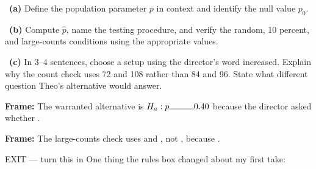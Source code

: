 \documentclass[11pt]{article}
\begin{document}
~\textbf{(a)} Define the population parameter $p$ in context and identify the null value $p_0$.\par
\workspace{0.7in}

~\textbf{(b)} Compute $\hat p$, name the testing procedure, and verify the random, 10 percent, and large-counts conditions using the appropriate values.\par
\workspace{1.4in}

~\textbf{(c)} In 3--4 sentences, choose a setup using the director's word increased. Explain why the count check uses 72 and 108 rather than 84 and 96. State what different question Theo's alternative would answer.\par
\workspace{2.0in}

\begin{sentenceframebox}\raggedright\textbf{Frame:} The warranted alternative is $H_a:p\blank[0.4in]0.40$ because the director asked whether \blank[2.2in].\end{sentenceframebox}

\begin{sentenceframebox}\raggedright\textbf{Frame:} The large-counts check uses \blank[0.8in] and \blank[0.8in], not \blank[1.0in], because \blank[2.4in].\end{sentenceframebox}

\begin{summaryexitbox}{EXIT --- turn this in}
One thing the rules box changed about my first take: \hrulefill\par
\workspace{0.4in}
\end{summaryexitbox}
\end{document}
